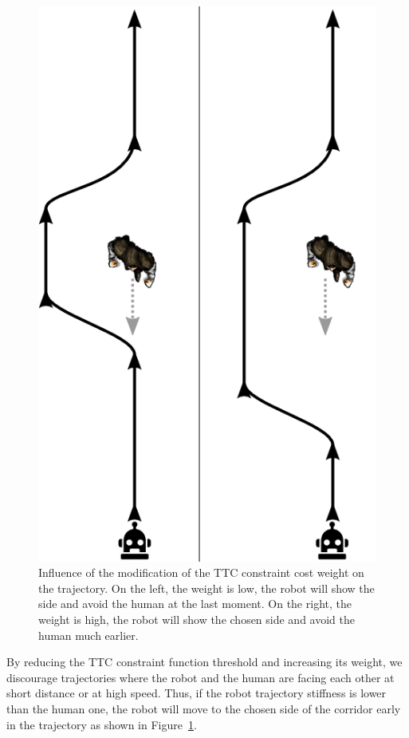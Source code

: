 \documentclass[a4paper,11pt,twoside]{StyleThese}
\begin{document}
\begin{figure}[hbtp]
\centering
\includegraphics[scale=0.3]{figures/chapter2/condition_1_proactivity_shrink.png}
\caption{Influence of the modification of the TTC constraint cost weight on the trajectory. On the left, the weight is low, the robot will show the side and avoid the human at the last moment. On the right, the weight is high, the robot will show the chosen side and avoid the human much earlier.}
\label{fig:ttc_explanations}
\end{figure}

By reducing the TTC constraint function threshold and increasing its weight, we discourage trajectories where the robot and the human are facing each other at short distance or at high speed. Thus, if the robot trajectory stiffness is lower than the human one, the robot will move to the chosen side of the corridor early in the trajectory as shown in Figure~\ref{fig:ttc_explanations}.
\end{document}
